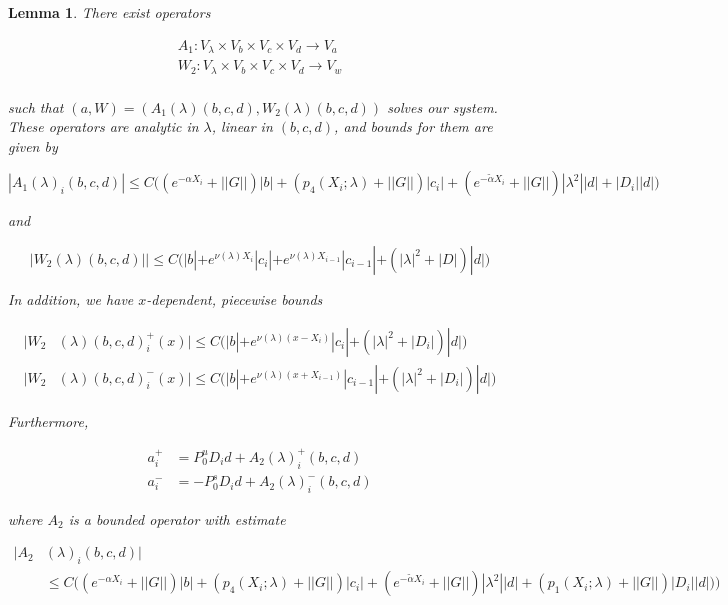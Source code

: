 \documentclass[12pt]{article}
\newtheorem{lemma}{Lemma}
\begin{document}
\begin{lemma}\label{endjoins}
There exist operators

\begin{align*}
A_1: V_\lambda \times V_b \times V_c \times V_d \rightarrow V_a \\
W_2: V_\lambda \times V_b \times V_c \times V_d \rightarrow V_w \\
\end{align*}

such that $(a,W) = ( A_1(\lambda)(b,c,d), W_2(\lambda)(b,c,d) )$ solves our system. These operators are analytic in $\lambda$, linear in $(b,c,d)$, and bounds for them are given by

\begin{equation}
|A_1(\lambda)_i(b, c, d)| \leq C \Big( (e^{-\alpha X_i} + ||G||) |b| + ( p_4(X_i; \lambda) + ||G|| )|c_i|
+ (e^{-\tilde{\alpha} X_i} + ||G||) |\lambda^2| |d| + |D_i||d| \Big)
\end{equation} 

and

\begin{equation}
|W_2(\lambda)(b,c,d)|| 
\leq C \Big( |b| + e^{\nu(\lambda)X_i}|c_i| + e^{\nu(\lambda)X_{i-1}}|c_{i-1}| + (|\lambda|^2 + |D|)|d| \Big)
\end{equation} 

In addition, we have $x$-dependent, piecewise bounds

\begin{align*}
|W_2&(\lambda)(b,c,d)_i^+(x)| \leq C \Big( |b| + e^{\nu(\lambda)(x - X_i)}|c_i| + (|\lambda|^2 + |D_i|)|d| \Big) \\
|W_2&(\lambda)(b,c,d)_i^-(x)| 
\leq C \Big( |b| + e^{\nu(\lambda)(x + X_{i-1})}|c_{i-1}| + (|\lambda|^2 + |D_i|)|d| \Big)
\end{align*}

Furthermore, 

\begin{align*}
a_i^+ &= P^u_0 D_i d + A_2(\lambda)_i^+(b, c, d) \\
a_i^- &= -P^s_0 D_i d + A_2(\lambda)_i^-(b, c, d)
\end{align*}

where $A_2$ is a bounded operator with estimate

\begin{align*}
|A_2&(\lambda)_i(b, c, d)| \\
&\leq C \Big( (e^{-\alpha X_i} + ||G||)|b| + ( p_4(X_i; \lambda) + ||G|| )|c_i| + (e^{-\tilde{\alpha} X_i} + ||G||) |\lambda^2| |d| + (p_1(X_i; \lambda) + ||G|| )|D_i||d|) \Big)
\end{align*}


\end{lemma}
\end{document}
